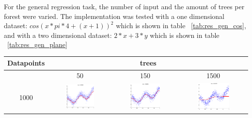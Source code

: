 For the general regression task, the number of input and the amount of trees per forest were varied. The implementation was tested with a one dimensional dataset: $cos(x*pi*4 + (x+1))^2$ which is shown in table ~\ref{tab:res_gen_cos}, and with a two dimensional dataset: $2*x + 3*y$ which is shown in table ~\ref{tab:res_gen_plane}

\begin{landscape}

\begin{table}[p]
\begin{tabular}{|c|c|c|c|}
\toprule
Datapoints & \multicolumn{3}{|c|}{trees} \\ \hline
\midrule
& 50 & 150 & 1500 \\ \hline
1000 & \includegraphics[width=0.5\textwidth, height=0.35\textheight]{fig/cos_1k_50} & \includegraphics[width=0.5\textwidth, height=0.35\textheight]{fig/cos_1k_150} & \includegraphics[width=0.5\textwidth, height=0.35\textheight]{fig/cos_1k_1500} \\ \hline

\end{tabular}
\end{table}
\end{landscape}
